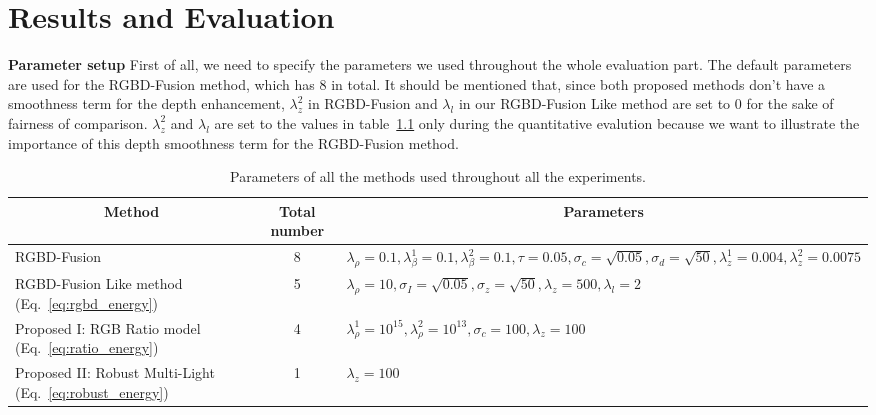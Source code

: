 \chapter{Results and Evaluation} \label{chap:result}
\textbf{Parameter setup}
First of all, we need to specify the parameters we used throughout the whole evaluation part. 
The default parameters are used for the RGBD-Fusion method, which has 8 in total. 
It should be mentioned that, since both proposed methods don't have a smoothness term for the depth enhancement, $\lambda_z^2$ in RGBD-Fusion and $\lambda_l$ in our RGBD-Fusion Like method are set to 0 for the sake of fairness of comparison.
$\lambda_z^2$ and $\lambda_l$ are set to the values in table~\ref{tab:parameter_setup} only during the quantitative evalution because we want to illustrate the importance of this depth smoothness term for the RGBD-Fusion method.
\begin{table}[!ht]
\caption{Parameters of all the methods used throughout all the experiments.}
\label{tab:parameter_setup}
\centering
\begin{tabular}{|m{4cm} |m{1.5cm} |m{7cm}|}
\hline
\multicolumn{1}{|c|}{Method}                               & \multicolumn{1}{c|}{Total number} & \multicolumn{1}{c|}{Parameters}                                                                                                                                          \\ \hline
RGBD-Fusion~\cite{or2015rgbd} & \multicolumn{1}{c|}{8}            &{$\lambda_\rho = 0.1, \lambda_\beta^1 = 0.1, \lambda_\beta^2 = 0.1, \tau = 0.05, \sigma_c = \sqrt{0.05}, \sigma_d = \sqrt{50}, \lambda_z^1 = 0.004, \lambda_z^2 = 0.0075$} \\ \hline
RGBD-Fusion Like method (Eq.~\ref{eq:rgbd_energy})                    & \multicolumn{1}{c|}{5}             & {$\lambda_{\rho} = 10, \sigma_I = \sqrt{0.05}, \sigma_z = \sqrt{50}, \lambda_z = 500, \lambda_l = 2$}                                                                                                                                                                         \\ \hline
Proposed I: RGB Ratio model (Eq.~\ref{eq:ratio_energy})                            & \multicolumn{1}{c|}{4}             & $\lambda_{\rho}^1 = 10^{15}, \lambda_{\rho}^2 = 10^{13}, \sigma_c = 100, \lambda_z = 100$                                                                                                                                                                                                                                                                                                                                                  \\ \hline
Proposed II: Robust Multi-Light  (Eq.~\ref{eq:robust_energy})                        & \multicolumn{1}{c|}{1}            & $\lambda_z = 100$                                                                                                                                                                          \\ \hline
\end{tabular}
\end{table}

